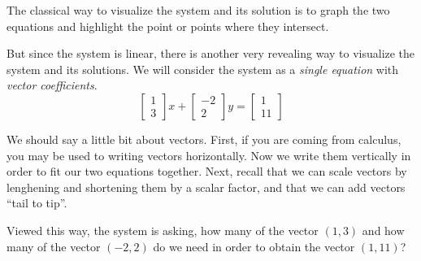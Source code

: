 \documentclass[11pt,oneside]{amsbook}
\theoremstyle{definition}
\theoremstyle{plain}
\theoremstyle{definition}
\theoremstyle{remark}
\numberwithin{equation}{section}
\numberwithin{figure}{section}
\begin{document}
The classical way to visualize the system and its solution is to graph the two equations and highlight the point or points where they intersect.
\begin{center}
\end{center}

But since the system is linear, there is another very revealing way to visualize the system and its solutions. We will consider the system as a \emph{single equation} with \emph{vector coefficients}.
\[\begin{bmatrix}1\\3\end{bmatrix}x+\begin{bmatrix}-2\\2\end{bmatrix}y
  =\begin{bmatrix}1\\11\end{bmatrix}
\]

We should say a little bit about vectors. First, if you are coming from calculus, you may be used to writing vectors horizontally. Now we write them vertically in order to fit our two equations together. Next, recall that we can scale vectors by lenghening and shortening them by a scalar factor, and that we can add vectors ``tail to tip''.

Viewed this way, the system is asking, how many of the vector $(1,3)$ and how many of the vector $(-2,2)$ do we need in order to obtain the vector $(1,11)$?

\begin{center}
\end{center}
\end{document}
